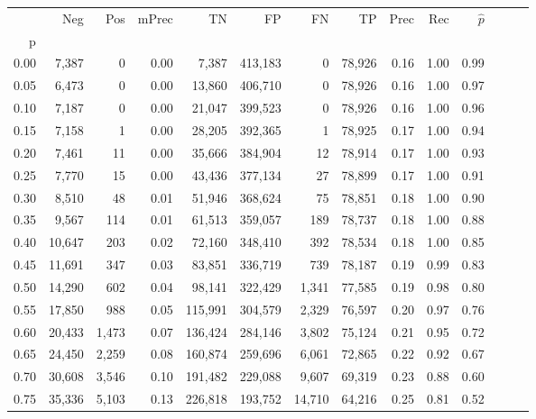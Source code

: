 \begin{tabular}{rrrrrrrrrrrrrr}
\toprule
{} &     Neg &     Pos & mPrec &       TN &       FP &      FN &      TP &  Prec &   Rec & $\hat{p}$ \\
p    &         &         &       &          &          &         &         &       &       &           \\
\midrule
0.00 &   7,387 &       0 &  0.00 &    7,387 &  413,183 &       0 &  78,926 &  0.16 &  1.00 &      0.99 \\
0.05 &   6,473 &       0 &  0.00 &   13,860 &  406,710 &       0 &  78,926 &  0.16 &  1.00 &      0.97 \\
0.10 &   7,187 &       0 &  0.00 &   21,047 &  399,523 &       0 &  78,926 &  0.16 &  1.00 &      0.96 \\
0.15 &   7,158 &       1 &  0.00 &   28,205 &  392,365 &       1 &  78,925 &  0.17 &  1.00 &      0.94 \\
0.20 &   7,461 &      11 &  0.00 &   35,666 &  384,904 &      12 &  78,914 &  0.17 &  1.00 &      0.93 \\
0.25 &   7,770 &      15 &  0.00 &   43,436 &  377,134 &      27 &  78,899 &  0.17 &  1.00 &      0.91 \\
0.30 &   8,510 &      48 &  0.01 &   51,946 &  368,624 &      75 &  78,851 &  0.18 &  1.00 &      0.90 \\
0.35 &   9,567 &     114 &  0.01 &   61,513 &  359,057 &     189 &  78,737 &  0.18 &  1.00 &      0.88 \\
0.40 &  10,647 &     203 &  0.02 &   72,160 &  348,410 &     392 &  78,534 &  0.18 &  1.00 &      0.85 \\
0.45 &  11,691 &     347 &  0.03 &   83,851 &  336,719 &     739 &  78,187 &  0.19 &  0.99 &      0.83 \\
0.50 &  14,290 &     602 &  0.04 &   98,141 &  322,429 &   1,341 &  77,585 &  0.19 &  0.98 &      0.80 \\
0.55 &  17,850 &     988 &  0.05 &  115,991 &  304,579 &   2,329 &  76,597 &  0.20 &  0.97 &      0.76 \\
0.60 &  20,433 &   1,473 &  0.07 &  136,424 &  284,146 &   3,802 &  75,124 &  0.21 &  0.95 &      0.72 \\
0.65 &  24,450 &   2,259 &  0.08 &  160,874 &  259,696 &   6,061 &  72,865 &  0.22 &  0.92 &      0.67 \\
0.70 &  30,608 &   3,546 &  0.10 &  191,482 &  229,088 &   9,607 &  69,319 &  0.23 &  0.88 &      0.60 \\
0.75 &  35,336 &   5,103 &  0.13 &  226,818 &  193,752 &  14,710 &  64,216 &  0.25 &  0.81 &      0.52 \\

\end{tabular}
